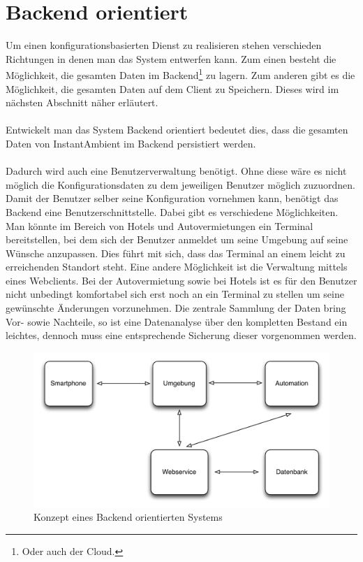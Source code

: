 \section{Backend orientiert}
Um einen konfigurationsbasierten Dienst zu realisieren stehen verschieden Richtungen in denen man das System entwerfen kann. 
Zum einen besteht die Möglichkeit, die gesamten Daten im Backend\footnote{Oder auch der Cloud.} zu lagern. Zum anderen gibt es die Möglichkeit, die gesamten Daten auf dem Client zu Speichern. Dieses wird im nächsten Abschnitt näher erläutert.
\\\\
Entwickelt man das System Backend orientiert bedeutet dies, dass die gesamten Daten von InstantAmbient im Backend persistiert werden. 
\\\\
Dadurch wird auch eine Benutzerverwaltung benötigt. Ohne diese wäre es nicht möglich die Konfigurationsdaten zu dem jeweiligen Benutzer möglich zuzuordnen. Damit der Benutzer selber seine Konfiguration vornehmen kann, benötigt das Backend eine Benutzerschnittstelle. Dabei gibt es verschiedene Möglichkeiten. Man könnte im Bereich von Hotels und Autovermietungen ein Terminal bereitstellen, bei dem sich der Benutzer anmeldet um seine Umgebung auf seine Wünsche anzupassen. Dies führt mit sich, dass das Terminal an einem leicht zu erreichenden Standort steht. Eine andere Möglichkeit ist die Verwaltung mittels eines Webclients. Bei der Autovermietung sowie bei Hotels ist es für den Benutzer nicht unbedingt komfortabel sich erst noch an ein Terminal zu stellen um seine gewünschte Änderungen vorzunehmen. Die zentrale Sammlung der Daten bring Vor- sowie Nachteile, so ist eine Datenanalyse über den kompletten Bestand ein leichtes, dennoch muss eine entsprechende Sicherung dieser vorgenommen werden. 
\begin{figure}[H]
\includegraphics[width=12.5cm]{images/backend}
\caption{Konzept eines Backend orientierten Systems}
\end{figure}

